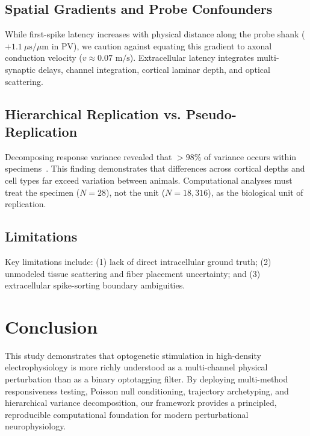 \documentclass[10pt,journal,compsoc]{IEEEtran}
\begin{document}
\subsection{Spatial Gradients and Probe Confounders}
While first-spike latency increases with physical distance along the probe shank ($+1.1\ \mu\text{s}/\mu\text{m}$ in PV), we caution against equating this gradient to axonal conduction velocity ($v \approx 0.07\text{ m/s}$). Extracellular latency integrates multi-synaptic delays, channel integration, cortical laminar depth, and optical scattering.

\subsection{Hierarchical Replication vs. Pseudo-Replication}
Decomposing response variance revealed that $>98\%$ of variance occurs within specimens~\cite{aarts2014solution,bates2015fitting}. This finding demonstrates that differences across cortical depths and cell types far exceed variation between animals. Computational analyses must treat the specimen ($N=28$), not the unit ($N=18,316$), as the biological unit of replication.

\subsection{Limitations}
Key limitations include: (1) lack of direct intracellular ground truth; (2) unmodeled tissue scattering and fiber placement uncertainty; and (3) extracellular spike-sorting boundary ambiguities.

\section{Conclusion}
This study demonstrates that optogenetic stimulation in high-density electrophysiology is more richly understood as a multi-channel physical perturbation than as a binary optotagging filter. By deploying multi-method responsiveness testing, Poisson null conditioning, trajectory archetyping, and hierarchical variance decomposition, our framework provides a principled, reproducible computational foundation for modern perturbational neurophysiology.

\end{document}

